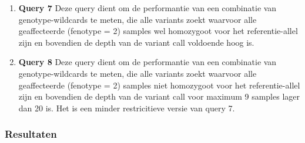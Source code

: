 \begin{enumerate}
\begin{adjustwidth}{-1.0in}{}

\end{adjustwidth}

\item \textbf{Query 7} Deze query dient om de performantie van een combinatie van genotype-wildcards te meten, die alle variants zoekt waarvoor alle geaffecteerde (fenotype = 2) samples wel homozygoot voor het referentie-allel zijn en bovendien de depth van de variant call voldoende hoog is.

\begin{adjustwidth}{-1.0in}{}

\end{adjustwidth}

\item \textbf{Query 8} Deze query dient om de performantie van een combinatie van genotype-wildcards te meten, die alle variants zoekt waarvoor alle geaffecteerde (fenotype = 2) samples niet homozygoot voor het referentie-allel zijn en bovendien de depth van de variant call voor maximum 9 samples lager dan 20 is. Het is een minder restricitieve versie van query 7.

\begin{adjustwidth}{-1.0in}{}

\end{adjustwidth}

\end{enumerate}

\subsubsection{Resultaten}

